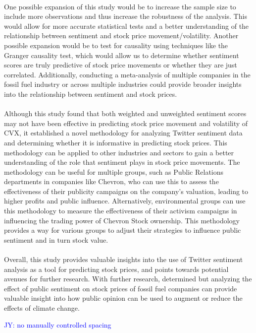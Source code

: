 \documentclass[12pt, letterpaper, titlepage]{article}
\newcommand{\jy}[1]{\textcolor{blue}{JY: #1}}
\begin{document}
\paragraph{}
One possible expansion of this study would be to increase the sample size to include more observations and thus increase the robustness of the analysis. This would allow for more accurate statistical tests and a better understanding of the relationship between sentiment and stock price movement/volatility. Another possible expansion would be to test for causality using techniques like the Granger causality test, which would allow us to determine whether sentiment scores are truly predictive of stock price movements or whether they are just correlated. Additionally, conducting a meta-analysis of multiple companies in the fossil fuel industry or across multiple industries could provide broader insights into the relationship between sentiment and stock prices. 


\paragraph{}
Although this study found that both weighted and unweighted sentiment scores may not have been effective in predicting stock price movement and volatility of CVX, it established a novel methodology for analyzing Twitter sentiment data and determining whether it is informative in predicting stock prices. This methodology can be applied to other industries and sectors to gain a better understanding of the role that sentiment plays in stock price movements. The methodology can be useful for multiple groups, such as Public Relations departments in companies like Chevron, who can use this to assess the effectiveness of their publicity campaigns on the company's valuation, leading to higher profits and public influence. Alternatively, environmental groups can use this methodology to measure the effectiveness of their activism campaigns in influencing the trading power of Chevron Stock ownership. This methodology provides a way for various groups to adjust their strategies to influence public sentiment and in turn stock value.

\paragraph{}
Overall, this study provides valuable insights into the use of Twitter sentiment analysis as a tool for predicting stock prices, and points towards potential avenues for further research. With further research, determined but analyzing the effect of public sentiment on stock prices of fossil fuel companies can provide valuable insight into how public opinion can be used to augment or reduce the effects of climate change.

\jy{no manually controlled spacing}



\end{document}
